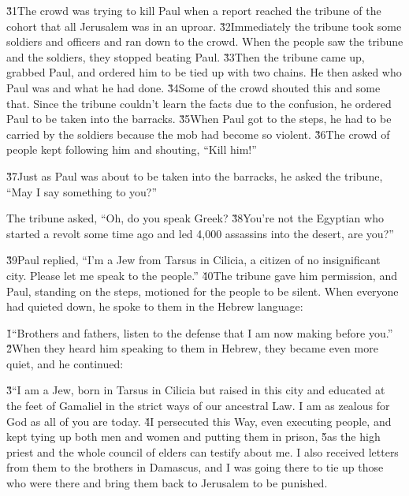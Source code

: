 \v{31}The crowd was trying to kill Paul when a report reached the tribune of the cohort that all Jerusalem was in an uproar. \v{32}Immediately the tribune took some soldiers and officers and ran down to the crowd. When the people saw the tribune and the soldiers, they stopped beating Paul. \v{33}Then the tribune came up, grabbed Paul, and ordered him to be tied up with two chains. He then asked who Paul was and what he had done. \v{34}Some of the crowd shouted this and some that. Since the tribune couldn't learn the facts due to the confusion, he ordered Paul to be taken into the barracks. \v{35}When Paul got to the steps, he had to be carried by the soldiers because the mob had become so violent. \v{36}The crowd of people kept following him and shouting, ``Kill him!''

\v{37}Just as Paul was about to be taken into the barracks, he asked the tribune, ``May I say something to you?''

The tribune asked, ``Oh, do you speak Greek? \v{38}You're not the Egyptian who started a revolt some time ago and led 4,000 assassins into the desert, are you?''

\v{39}Paul replied, ``I'm a Jew from Tarsus in Cilicia, a citizen of no insignificant city. Please let me speak to the people.'' \v{40}The tribune gave him permission, and Paul, standing on the steps, motioned for the people to be silent. When everyone had quieted down, he spoke to them in the Hebrew language:

\v{1}``Brothers and fathers, listen to the defense that I am now making before you.'' \v{2}When they heard him speaking to them in Hebrew, they became even more quiet, and he continued:

\v{3}``I am a Jew, born in Tarsus in Cilicia but raised in this city and educated at the feet of Gamaliel in the strict ways of our ancestral Law. I am as zealous for God as all of you are today. \v{4}I persecuted this Way, even executing people, and kept tying up both men and women and putting them in prison, \v{5}as the high priest and the whole council of elders can testify about me. I also received letters from them to the brothers in Damascus, and I was going there to tie up those who were there and bring them back to Jerusalem to be punished.

